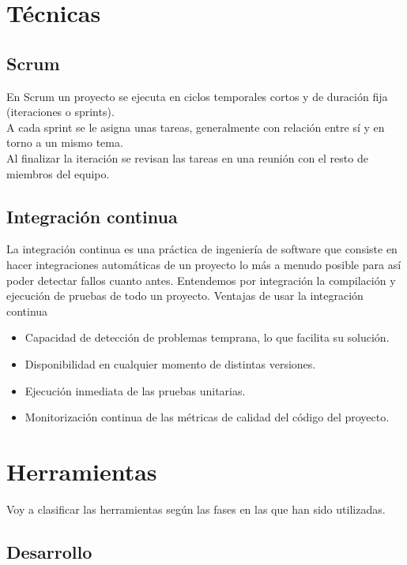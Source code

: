 \section{Técnicas}
\subsection{Scrum}
En Scrum un proyecto se ejecuta en ciclos temporales cortos y de duración fija (iteraciones o sprints).\cite{scrum:definicion}\\
A cada sprint se le asigna unas tareas, generalmente con relación entre sí y en torno a un mismo tema.\\ 
Al finalizar la iteración se revisan las tareas en una reunión con el resto de miembros del equipo. 
\subsection{Integración continua}
La integración continua es una práctica de ingeniería de software que consiste en hacer integraciones automáticas de un proyecto lo más a menudo posible para así poder detectar fallos cuanto antes. Entendemos por integración la compilación y ejecución de pruebas de todo un proyecto.\cite{IntegracionContinua}
Ventajas de usar la integración continua 
\begin{itemize}
    \item Capacidad de detección de problemas temprana, lo que facilita su solución.
    \item Disponibilidad en cualquier momento de distintas versiones.
    \item Ejecución inmediata de las pruebas unitarias.
    \item Monitorización continua de las métricas de calidad del código del proyecto.
\end{itemize}
\section{Herramientas}
Voy a clasificar las herramientas según las fases en las que han sido utilizadas.  
\subsection{Desarrollo}
